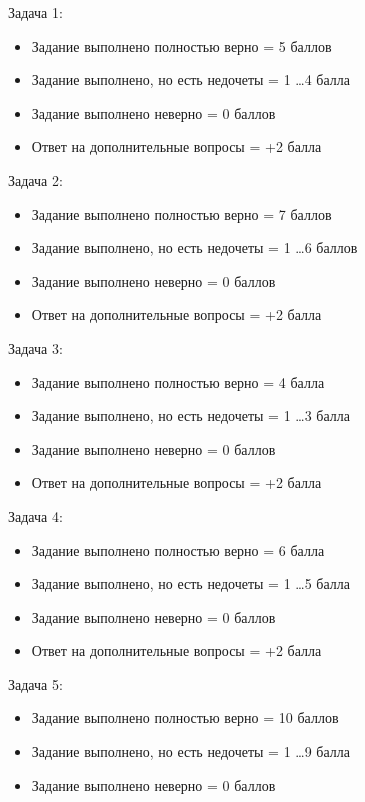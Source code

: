 \markSection

Задача 1:

\begin{itemize}
    \item	Задание выполнено полностью верно = 5 баллов 
    \item	Задание выполнено, но есть недочеты = 1 \dots 4 балла
    \item	Задание выполнено неверно = 0 баллов
    \item	Ответ на дополнительные вопросы = +2 балла
\end{itemize}

Задача 2:

\begin{itemize}
    \item	Задание выполнено полностью верно = 7 баллов 
    \item	Задание выполнено, но есть недочеты = 1 \dots 6 баллов
    \item	Задание выполнено неверно = 0 баллов
    \item	Ответ на дополнительные вопросы = +2 балла
\end{itemize}

Задача 3:

\begin{itemize}
    \item	Задание выполнено полностью верно = 4 балла 
    \item	Задание выполнено, но есть недочеты = 1 \dots 3 балла
    \item	Задание выполнено неверно = 0 баллов
    \item	Ответ на дополнительные вопросы = +2 балла
\end{itemize}

Задача 4:

\begin{itemize}
    \item	Задание выполнено полностью верно = 6 балла 
    \item	Задание выполнено, но есть недочеты = 1 \dots 5 балла
    \item	Задание выполнено неверно = 0 баллов
    \item	Ответ на дополнительные вопросы = +2 балла
\end{itemize}

Задача 5:

\begin{itemize}    
    \item Задание выполнено полностью верно = 10 баллов
    \item Задание выполнено, но есть недочеты = 1 \dots 9 балла
    \item Задание выполнено неверно = 0 баллов
\end{itemize}

